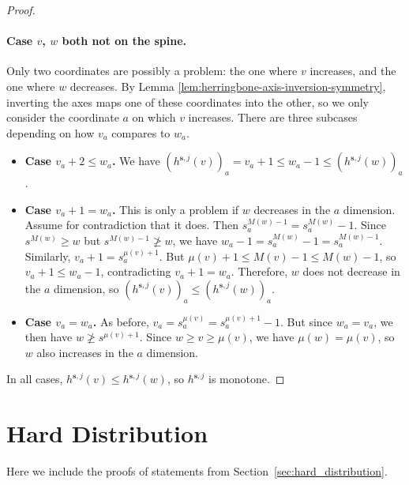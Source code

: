 \documentclass[11pt]{article}
\begin{document}
\begin{proof}
    \paragraph{Case $v$, $w$ both not on the spine.} Only two coordinates are possibly a problem: the one where $v$ increases, and the one where $w$ decreases. By Lemma \ref{lem:herringbone-axis-inversion-symmetry}, inverting the axes maps one of these coordinates into the other, so we only consider the coordinate $a$ on which $v$ increases. There are three subcases depending on how $v_a$ compares to $w_a$.
    \begin{itemize}
        \item \textbf{Case $v_a + 2 \leq w_a$.} We have $(h^{\mathbf{s}, j}(v))_a = v_a + 1 \leq w_a - 1 \leq (h^{\mathbf{s}, j}(w))_a$.
        \item \textbf{Case $v_a + 1 = w_a$.} This is only a problem if $w$ decreases in the $a$ dimension. Assume for contradiction that it does. Then $s^{M(w)-1}_a = s^{M(w)}_a - 1$. Since $s^{M(w)} \geq w$ but $s^{M(w)-1} \not \geq w$, we have $w_a - 1 = s^{M(w)}_a - 1 = s^{M(w)-1}_a$. Similarly, $v_a + 1 = s^{\mu(v)+1}_a$. But $\mu(v) + 1 \leq M(v) - 1 \leq M(w) - 1$, so $v_a + 1 \leq w_a - 1$, contradicting $v_a + 1 = w_a$. Therefore, $w$ does not decrease in the $a$ dimension, so $(h^{\mathbf{s}, j}(v))_a \leq (h^{\mathbf{s}, j}(w))_a$.
        \item \textbf{Case $v_a = w_a$.} As before, $v_a = s^{\mu(v)}_a = s^{\mu(v) + 1}_a - 1$. But since $w_a = v_a$, we then have $w \not \geq s^{\mu(v)+1}$. Since $w \geq v \geq \mu(v)$, we have $\mu(w) = \mu(v)$, so $w$ also increases in the $a$ dimension.     
        \end{itemize}

    In all cases, $h^{\mathbf{s}, j}(v) \leq h^{\mathbf{s}, j}(w)$, so $h^{\mathbf{s}, j}$ is monotone.
\end{proof}

\section{Hard Distribution} \label{app:hard_distribution}

Here we include the proofs of statements  from Section~\ref{sec:hard_distribution}.
\end{document}
